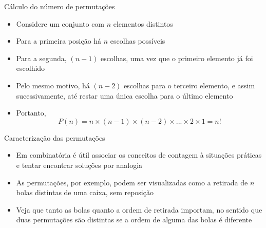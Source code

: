 \begin{frame}[fragile]{Cálculo do número de permutações}

    \begin{itemize}
        \item Considere um conjunto com $n$ elementos distintos

        \item Para a primeira posição há $n$ escolhas possíveis

        \item Para a segunda, $(n - 1)$ escolhas, uma vez que o primeiro elemento já foi escolhido

        \item Pelo mesmo motivo, há $(n - 2)$ escolhas para o terceiro elemento, e assim sucessivamente, até restar 
            uma única escolha para o último elemento

        \item Portanto,
$$
        P(n) = n \times (n - 1) \times (n - 2) \times ... \times 2 \times 1 = n!
$$
    \end{itemize}

\end{frame}

\begin{frame}[fragile]{Caracterização das permutações}

    \begin{itemize}
        \item Em combinatória é útil associar os conceitos de contagem à situações práticas e tentar encontrar
            soluções por analogia

        \item As permutações, por exemplo, podem ser visualizadas como a retirada de $n$ bolas distintas de uma
            caixa, sem reposição

        \item Veja que tanto as bolas quanto a ordem de retirada importam, no sentido que duas permutações são
            distintas se a ordem de alguma das bolas é diferente
    \end{itemize}

\end{frame}

